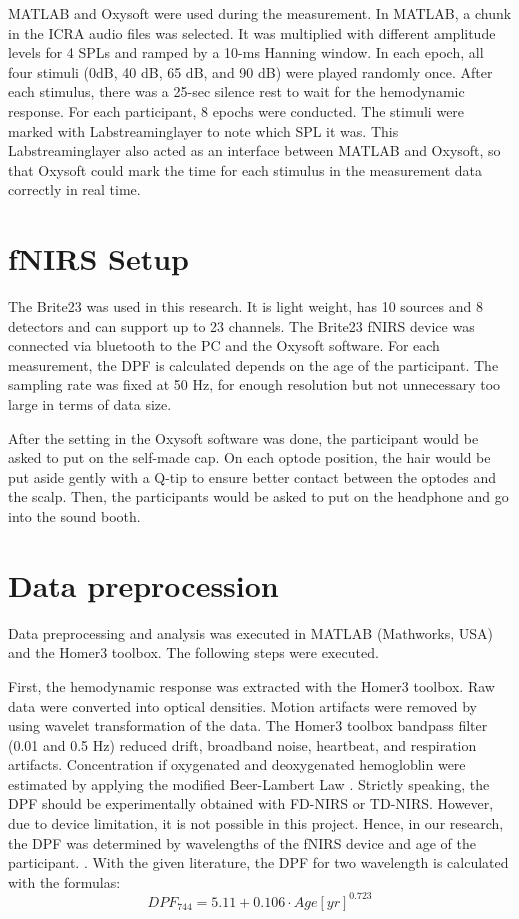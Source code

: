 MATLAB and Oxysoft were used during the measurement. In MATLAB, a chunk in the ICRA audio files was selected. It was multiplied with different amplitude levels for 4 SPLs and ramped by a 10-ms Hanning window. In each epoch, all four stimuli (0dB, 40 dB, 65 dB, and 90 dB) were played randomly once. After each stimulus, there was a 25-sec silence rest to wait for the hemodynamic response. For each participant, 8 epochs were conducted. The stimuli were marked with Labstreaminglayer to note which SPL it was. This Labstreaminglayer also acted as an interface between MATLAB and Oxysoft, so that Oxysoft could mark the time for each stimulus in the measurement data correctly in real time.

\section {fNIRS Setup}
The Brite23 was used in this research. It is light weight, has 10 sources and 8 detectors and can support up to 23 channels. The Brite23 fNIRS device was connected via bluetooth to the PC and the Oxysoft software. For each measurement, the DPF is calculated depends on the age of the participant. The sampling rate was fixed at 50 Hz, for enough resolution but not unnecessary too large in terms of data size.

After the setting in the Oxysoft software was done, the participant would be asked to put on the self-made cap. On each optode position, the hair would be put aside gently with a Q-tip to ensure better contact between the optodes and the scalp. Then, the participants would be asked to put on the headphone and go into the sound booth.


\section {Data preprocession}
Data preprocessing and analysis was executed in MATLAB (Mathworks, USA) and the Homer3 toolbox. The following steps were executed.

First, the hemodynamic response was extracted with the Homer3 toolbox. Raw data were converted into optical densities. Motion artifacts were removed by using wavelet transformation of the data. The Homer3 toolbox bandpass filter (0.01 and 0.5 Hz) reduced drift, broadband noise, heartbeat, and respiration artifacts. Concentration if oxygenated and deoxygenated hemogloblin were estimated by applying the modified Beer-Lambert Law  \cite {Delpy_1988}. Strictly speaking, the DPF should be experimentally obtained with FD-NIRS or TD-NIRS. However, due to device limitation, it is not possible in this project. Hence, in our research, the DPF was determined by wavelengths of the fNIRS device and age of the participant. \cite {Duncan1996MeasurementOC}. With the given literature, the DPF for two wavelength is calculated with the formulas:
\[
DPF_{744} = 5.11 + 0.106 \cdot Age[yr]^{0.723}
\]

